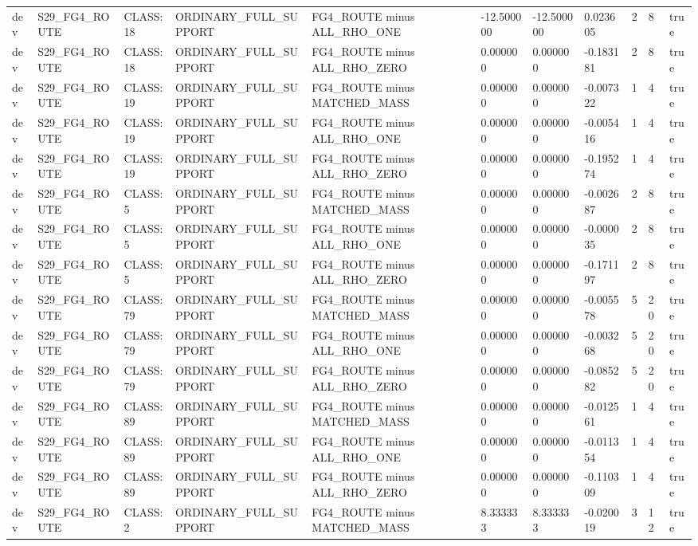 \begin{tabular}{lllllllllll}
dev & S29\_FG4\_ROUTE & CLASS:18 & ORDINARY\_FULL\_SUPPORT & FG4\_ROUTE minus ALL\_RHO\_ONE & -12.500000 & -12.500000 & 0.023605 & 2 & 8 & true \\
dev & S29\_FG4\_ROUTE & CLASS:18 & ORDINARY\_FULL\_SUPPORT & FG4\_ROUTE minus ALL\_RHO\_ZERO & 0.000000 & 0.000000 & -0.183181 & 2 & 8 & true \\
dev & S29\_FG4\_ROUTE & CLASS:19 & ORDINARY\_FULL\_SUPPORT & FG4\_ROUTE minus MATCHED\_MASS & 0.000000 & 0.000000 & -0.007322 & 1 & 4 & true \\
dev & S29\_FG4\_ROUTE & CLASS:19 & ORDINARY\_FULL\_SUPPORT & FG4\_ROUTE minus ALL\_RHO\_ONE & 0.000000 & 0.000000 & -0.005416 & 1 & 4 & true \\
dev & S29\_FG4\_ROUTE & CLASS:19 & ORDINARY\_FULL\_SUPPORT & FG4\_ROUTE minus ALL\_RHO\_ZERO & 0.000000 & 0.000000 & -0.195274 & 1 & 4 & true \\
dev & S29\_FG4\_ROUTE & CLASS:5 & ORDINARY\_FULL\_SUPPORT & FG4\_ROUTE minus MATCHED\_MASS & 0.000000 & 0.000000 & -0.002687 & 2 & 8 & true \\
dev & S29\_FG4\_ROUTE & CLASS:5 & ORDINARY\_FULL\_SUPPORT & FG4\_ROUTE minus ALL\_RHO\_ONE & 0.000000 & 0.000000 & -0.000035 & 2 & 8 & true \\
dev & S29\_FG4\_ROUTE & CLASS:5 & ORDINARY\_FULL\_SUPPORT & FG4\_ROUTE minus ALL\_RHO\_ZERO & 0.000000 & 0.000000 & -0.171197 & 2 & 8 & true \\
dev & S29\_FG4\_ROUTE & CLASS:79 & ORDINARY\_FULL\_SUPPORT & FG4\_ROUTE minus MATCHED\_MASS & 0.000000 & 0.000000 & -0.005578 & 5 & 20 & true \\
dev & S29\_FG4\_ROUTE & CLASS:79 & ORDINARY\_FULL\_SUPPORT & FG4\_ROUTE minus ALL\_RHO\_ONE & 0.000000 & 0.000000 & -0.003268 & 5 & 20 & true \\
dev & S29\_FG4\_ROUTE & CLASS:79 & ORDINARY\_FULL\_SUPPORT & FG4\_ROUTE minus ALL\_RHO\_ZERO & 0.000000 & 0.000000 & -0.085282 & 5 & 20 & true \\
dev & S29\_FG4\_ROUTE & CLASS:89 & ORDINARY\_FULL\_SUPPORT & FG4\_ROUTE minus MATCHED\_MASS & 0.000000 & 0.000000 & -0.012561 & 1 & 4 & true \\
dev & S29\_FG4\_ROUTE & CLASS:89 & ORDINARY\_FULL\_SUPPORT & FG4\_ROUTE minus ALL\_RHO\_ONE & 0.000000 & 0.000000 & -0.011354 & 1 & 4 & true \\
dev & S29\_FG4\_ROUTE & CLASS:89 & ORDINARY\_FULL\_SUPPORT & FG4\_ROUTE minus ALL\_RHO\_ZERO & 0.000000 & 0.000000 & -0.110309 & 1 & 4 & true \\
dev & S29\_FG4\_ROUTE & CLASS:2 & ORDINARY\_FULL\_SUPPORT & FG4\_ROUTE minus MATCHED\_MASS & 8.333333 & 8.333333 & -0.020019 & 3 & 12 & true \\

\end{tabular}
